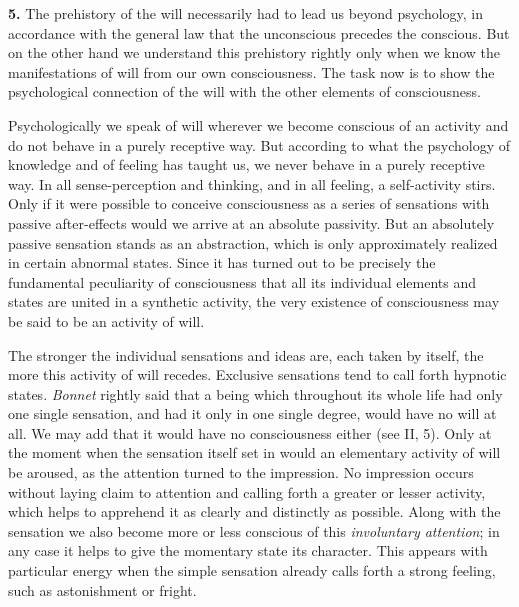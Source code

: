 \documentclass[12pt,a4paper]{book}
\newcommand{\opage}[1]{\marginnote{\footnotesize\textit{[#1]}}}
\begin{document}
\textbf{5.} The prehistory of the will necessarily had to lead us beyond
psychology, in accordance with the general law that the unconscious
precedes the conscious. But on the other hand we understand this
prehistory rightly only when we know the manifestations of will from our
own consciousness. The task now is to show the psychological connection
of the will with the other elements of consciousness.

Psychologically we speak of will wherever we become conscious of an
activity and do not behave in a purely receptive way. But according to
what the psychology of knowledge and of feeling has taught us, we never
behave in a purely receptive way. In all sense-perception and thinking,
and in all feeling, a self-activity stirs. Only if it were possible to
conceive consciousness as a series of sensations with passive
after-effects would we arrive at an absolute passivity. But an absolutely
passive sensation stands as an abstraction, which is only approximately
realized in certain abnormal states. Since it has turned out to be
precisely the fundamental peculiarity of consciousness that all its
individual elements and states are united in a synthetic activity, the
very existence of consciousness may be said to be an activity of will.

The stronger the individual sensations and ideas are, each taken by
itself, the more this activity of will recedes. Exclusive sensations tend
to call forth hypnotic states. \emph{Bonnet} rightly said that a being
which throughout its whole life had only one single sensation, and had it
only in one single degree, would
\opage{372}have no will at all. We may add that it would have no
consciousness either (see II, 5). Only at the moment when the sensation
itself set in would an elementary activity of will be aroused, as the
attention turned to the impression. No impression occurs without laying
claim to attention and calling forth a greater or lesser activity, which
helps to apprehend it as clearly and distinctly as possible. Along with
the sensation we also become more or less conscious of this
\emph{involuntary attention}; in any case it helps to give the momentary
state its character. This appears with particular energy when the simple
sensation already calls forth a strong feeling, such as astonishment or
fright.
\end{document}
